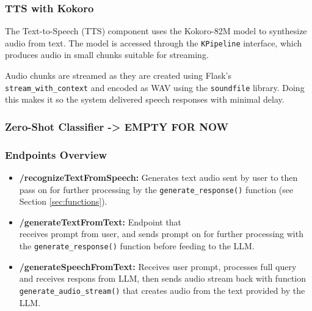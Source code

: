 \documentclass[twocolumn]{article}
\begin{document}
\subsubsection{TTS with Kokoro}
The Text-to-Speech (TTS) component uses the Kokoro-82M model\cite{kokoro82m} to synthesize audio from text. The model is accessed through the \texttt{KPipeline} interface, which produces audio in small chunks suitable for streaming.

Audio chunks are streamed as they are created using Flask's \texttt{stream\_with\_context} and encoded as WAV using the \texttt{soundfile}\cite{soundfile} library. Doing this makes it so the system delivered speech responses with minimal delay.

\subsubsection{Zero-Shot Classifier -> EMPTY FOR NOW}
\subsubsection{Endpoints Overview}
\begin{itemize}
    \item \textbf{/recognizeTextFromSpeech:} Generates text audio sent by user to then pass on for further processing by the \texttt{generate\_response()} function (see Section \ref{sec:functions}).
    \item \textbf{/generateTextFromText:} Endpoint that\\ receives prompt from user, and sends prompt on for further processing with the \texttt{generate\_response()} function before feeding to the LLM.
    \item \textbf{/generateSpeechFromText:} Receives user prompt, processes full query and receives respons from LLM, then sends audio stream back with function \texttt{generate\_audio\_stream()} that creates audio from the text provided by the LLM.
\end{itemize}
\end{document}
